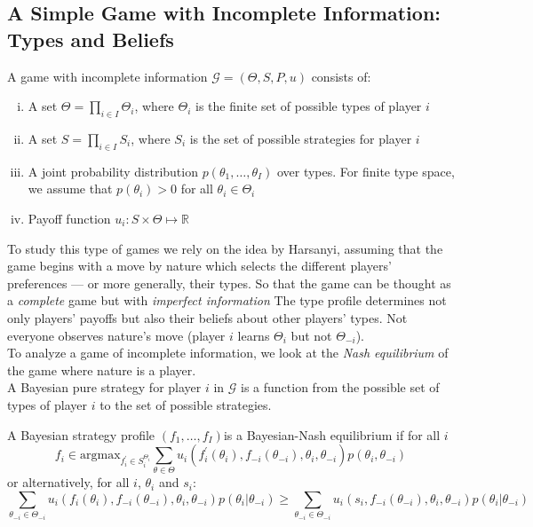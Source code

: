 
\subsection*{A Simple Game with Incomplete Information: Types and Beliefs}

\begin{dfn} A game with incomplete information $\mathcal{G}=(\Theta, S, P, u)$ consists of:
\begin{enumerate}[(i)]
\item A set $\Theta=\prod_{i\in I}\Theta_i$, where $\Theta_i$ is the finite set of possible types of player $i$ 
\item A set $S=\prod_{i\in I} S_i$, where $S_i$ is the set of possible strategies for player $i$
\item A joint probability distribution $p(\theta_1,\ldots, \theta_I)$ over types. For finite type space, we assume that $p(\theta_i)>0$ for all $\theta_i\in \Theta_i$
\item Payoff function $u_i:S\times \Theta\longmapsto \mathbb{R}$
\end{enumerate}
\end{dfn}

To study this type of games we rely on the idea by Harsanyi, assuming that the game begins with a move by nature which selects the different players’ preferences — or more generally, their types. So that the game can be thought as a \emph{complete} game but with \emph{imperfect information}
The type profile determines not only players’ payoffs but also their beliefs about other players’ types. Not everyone observes nature's move (player $i$ learns $\Theta_i$ but not $\Theta_{-i}$).\\

To analyze a game of incomplete information, we look at the \emph{Nash equilibrium} of the game where nature is a player. \\

A Bayesian pure strategy for player $i$ in $\mathcal{G}$ is a function from the possible set of types of player $i$ to the set of possible strategies.\\


\begin{dfn} A Bayesian strategy profile $(f_1,\ldots, f_I)$is a Bayesian-Nash equilibrium if for all $i$
\[f_i\in \text{argmax}_{f_{i}^{\prime}\in S_{i}^{\Theta_i}} \sum_{\theta\in \Theta} u_i\left(f_{i}^{\prime}(\theta_i), f_{-i}(\theta_{-i}),\theta_i, \theta_{-i}\right)p(\theta_i,\theta_{-i})\]
or alternatively, for all $i$, $\theta_i$ and $s_i$:
\[\sum_{\theta_{-i}\in \Theta_{-i}} u_i\left(f_{i}(\theta_i), f_{-i}(\theta_{-i}),\theta_i, \theta_{-i} \right) p(\theta_i|\theta_{-i})\geq \sum_{\theta_{-i}\in \Theta_{-i}} u_i\left(s_i, f_{-i}(\theta_{-i}),\theta_i, \theta_{-i} \right) p(\theta_i|\theta_{-i})\]
\end{dfn}

